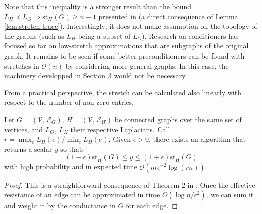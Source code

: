 Note that this inequality is a stronger result than the bound $L_{H}\preceq L_{G}\Rightarrow\text{st}_{H}\left(G\right)\geq n-1$
presented in \cite{Spielman2009b} (a direct consequence of Lemma
\ref{lem:stretch-trace}). Interestingly, it does not make assumption
on the topology of the graphs (such as $L_{H}$ being a subset of
$L_{G}$). Research on conditioners has focused so far on low-stretch
approximations that are subgraphs of the original graph. It remains
to be seen if some better preconditioners can be found with stretches
in $\mathcal{O}\left(n\right)$ by considering more general graphs.
In this case, the machinery developped in Section 3 would not be necessary.

From a practical perspective, the stretch can be calculated also linearly
with respect to the number of non-zero entries.

\begin{lemma}\label{lem:stretch-approx}Let $G=\left(\mathcal{V},\,\mathcal{E}_{G}\right),\, H=\left(\mathcal{V},\,\mathcal{E}_{H}\right)$
be connected graphs over the same set of vertices, and $L_{G}$, $L_{H}$
their respective Laplacians. Call $r=\max_{e}L_{H}\left(e\right)/\min_{e}L_{H}\left(e\right)$.
Given $\epsilon>0$, there exists an algorithm that returns a scalar
$y$ so that:
\[
\left(1-\epsilon\right)\text{st}_{H}\left(G\right)\leq y\leq\left(1+\epsilon\right)\text{st}_{H}\left(G\right)
\]
with high probability and in expected time $\tilde{\mathcal{O}}\left(m\epsilon^{-2}\log\left(rn\right)\right)$.

\end{lemma}

\begin{proof}This is a straightforward consequence of Theorem $2$
in \cite{Spielman2009}. Once the effective resistance of an edge
can be approximated in time $O\left(\log n/\epsilon^{2}\right)$,
we can sum it and weight it by the conductance in $G$ for each edge.

\end{proof}
